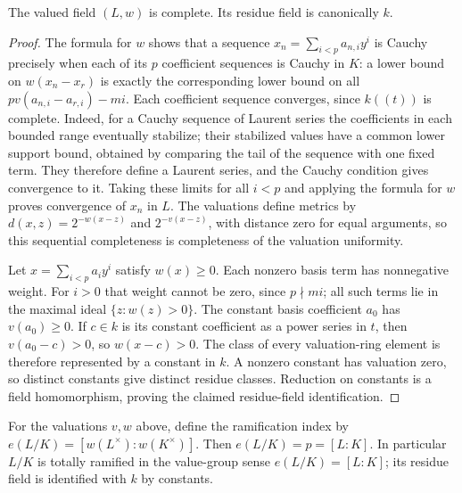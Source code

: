 \begin{lemma}
\label{lem:artin-schreier-complete-residue}
\leanok
The valued field $(L,w)$ is complete. Its residue field is
canonically $k$.
\end{lemma}

\begin{proof}
The formula for $w$ shows that a sequence
$x_n=\sum_{i<p}a_{n,i}y^i$ is Cauchy precisely when each of its
$p$ coefficient sequences is Cauchy in $K$: a lower bound on
$w(x_n-x_r)$ is exactly the corresponding lower bound on all
$p v(a_{n,i}-a_{r,i})-mi$.
Each coefficient sequence converges, since $k((t))$ is complete.
Indeed, for a Cauchy sequence of Laurent series the coefficients
in each bounded range eventually stabilize; their stabilized
values have a common lower support bound, obtained by comparing
the tail of the sequence with one fixed term. They therefore
define a Laurent series, and the Cauchy condition gives
convergence to it. Taking these limits for all $i<p$ and applying
the formula for $w$ proves convergence of $x_n$ in $L$.
The valuations define metrics by $d(x,z)=2^{-w(x-z)}$ and
$2^{-v(x-z)}$, with distance zero for equal arguments, so this
sequential completeness is completeness of the valuation
uniformity.

Let $x=\sum_{i<p}a_i y^i$ satisfy $w(x)\ge0$.
Each nonzero basis term has nonnegative weight. For $i>0$
that weight cannot be zero, since $p\nmid mi$; all such terms
lie in the maximal ideal $\{z:w(z)>0\}$. The constant basis
coefficient $a_0$ has $v(a_0)\ge0$. If $c\in k$ is its
constant coefficient as a power series in $t$, then
$v(a_0-c)>0$, so $w(x-c)>0$.
The class of every valuation-ring element is therefore represented
by a constant in $k$. A nonzero constant has valuation zero,
so distinct constants give distinct residue classes. Reduction
on constants is a field homomorphism, proving the claimed
residue-field identification.
\end{proof}

\begin{lemma}
\label{lem:artin-schreier-total-ramification}
\leanok
For the valuations $v,w$ above, define the ramification index by
$e(L/K)=[w(L^\times):w(K^\times)]$. Then $e(L/K)=p=[L:K]$.
In particular $L/K$ is totally ramified in the value-group sense
$e(L/K)=[L:K]$; its residue field is identified with $k$ by constants.
\end{lemma}

